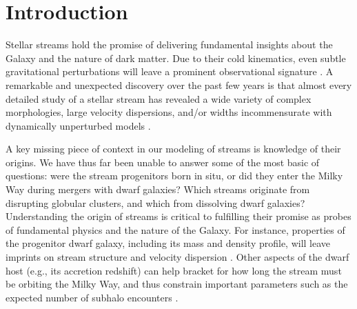 \documentclass[twocolumn]{aastex63}
\begin{document}

\section{Introduction}
\label{sec:intro}





Stellar streams hold the promise of delivering fundamental insights about the Galaxy and the nature of dark matter.
Due to their cold kinematics, even subtle gravitational perturbations will leave a prominent observational signature \citep[e.g., gaps due to encounters with dark matter subhalos, fans due to encounters with the bar,][]{johnston2002, pearson2017, bonaca2019a}.
A remarkable and unexpected discovery over the past few years is that almost every detailed study of a stellar stream has revealed a wide variety of complex morphologies, large velocity dispersions, and/or widths incommensurate with dynamically unperturbed models \citep[e.g.,][]{pwb, bonaca2019b, bonaca2020a, li2020, gialluca2020}.

A key missing piece of context in our modeling of streams is knowledge of their origins. 
We have thus far been unable to answer some of the most basic of questions: were the stream progenitors born in situ, or did they enter the Milky Way during mergers with dwarf galaxies?
Which streams originate from disrupting globular clusters, and which from dissolving dwarf galaxies?
Understanding the origin of streams is critical to fulfilling their promise as probes of fundamental physics and the nature of the Galaxy.
For instance, properties of the progenitor dwarf galaxy, including its mass and density profile, will leave imprints on stream structure and velocity dispersion \citep[][]{carlberg2018, malhan2020}.
Other aspects of the dwarf host (e.g., its accretion redshift) can help bracket for how long the stream must be orbiting the Milky Way, and thus constrain important parameters such as the expected number of subhalo encounters \citep[e.g.,][]{erkal2016}.
\end{document}
